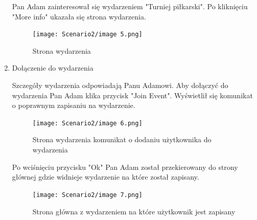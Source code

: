 \documentclass[11pt,a4paper]{article}
\begin{document}
\begin{enumerate}
    Pan Adam zainteresował się wydarzeniem "Turniej piłkarski". Po kliknięciu "More info" ukazała się strona wydarzenia.

    \begin{figure} [H]
    \centering
    \texttt{[image: Scenario2/image 5.png]}
    \caption{Strona wydarzenia}
    \end{figure}

    \item Dołączenie do wydarzenia

    Szczegóły wydarzenia odpowiadają Panu Adamowi. Aby dołączyć do wydarzenia Pan Adam klika przycisk "Join Event". Wyświetlił się komunikat o poprawnym zapisaniu na wydarzenie.

    \begin{figure} [H]
    \centering
    \texttt{[image: Scenario2/image 6.png]}
    \caption{Strona wydarzenia komunikat o dodaniu użytkownika do wydarzenia}
    \end{figure}

    Po wciśnięciu przycisku "Ok" Pan Adam został przekierowany do strony głównej gdzie widnieje wydarzenie na które został zapisany.

    \begin{figure} [H]
    \centering
    \texttt{[image: Scenario2/image 7.png]}
    \caption{Strona główna z wydarzeniem na które użytkownik jest zapisany}
    \end{figure}
    
\end{enumerate}
\end{document}
